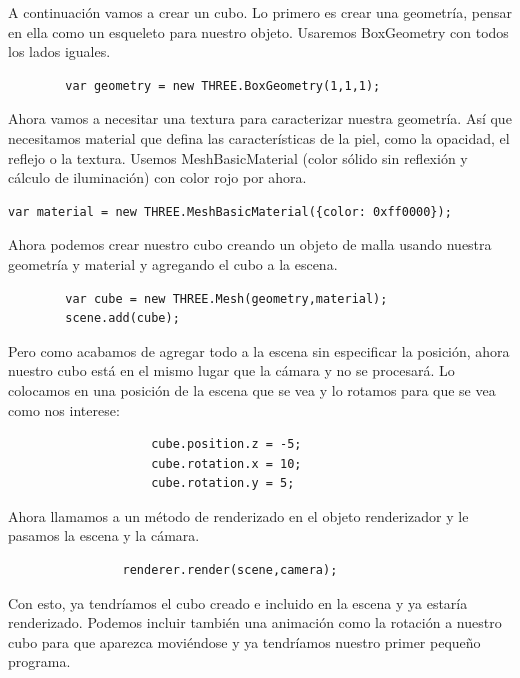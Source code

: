 \documentclass[a4paper, 12pt]{book}
\begin{document}
A continuación vamos a crear un cubo.
Lo primero es crear una geometría, pensar en ella como un esqueleto para nuestro objeto. Usaremos BoxGeometry con todos los lados iguales.
\begin{verbatim}
        var geometry = new THREE.BoxGeometry(1,1,1);
\end{verbatim}

Ahora vamos a necesitar una textura para caracterizar nuestra geometría. Así que necesitamos material que defina las características de la piel, como la opacidad, el reflejo o la textura. Usemos MeshBasicMaterial (color sólido sin reflexión y cálculo de iluminación) con color rojo por ahora.
\begin{verbatim}
var material = new THREE.MeshBasicMaterial({color: 0xff0000});
\end{verbatim}
Ahora podemos crear nuestro cubo creando un objeto de malla usando nuestra geometría y material y agregando el cubo a la escena.
\begin{verbatim}
        var cube = new THREE.Mesh(geometry,material);
        scene.add(cube);
\end{verbatim}
Pero como acabamos de agregar todo a la escena sin especificar la posición, ahora nuestro cubo está en el mismo lugar que la cámara y no se procesará. Lo colocamos en una posición de la escena que se vea y lo rotamos para que se vea como nos interese:

\begin{verbatim}
                    cube.position.z = -5;
                    cube.rotation.x = 10;
                    cube.rotation.y = 5;
\end{verbatim}

Ahora llamamos a un método de renderizado en el objeto renderizador y le pasamos la escena y la cámara.
\begin{verbatim}
                renderer.render(scene,camera);
\end{verbatim}

Con esto, ya tendríamos el cubo creado e incluido en la escena y ya estaría renderizado. Podemos incluir también una animación como la rotación a nuestro cubo para que aparezca moviéndose y ya tendríamos nuestro primer pequeño programa.
\end{document}
